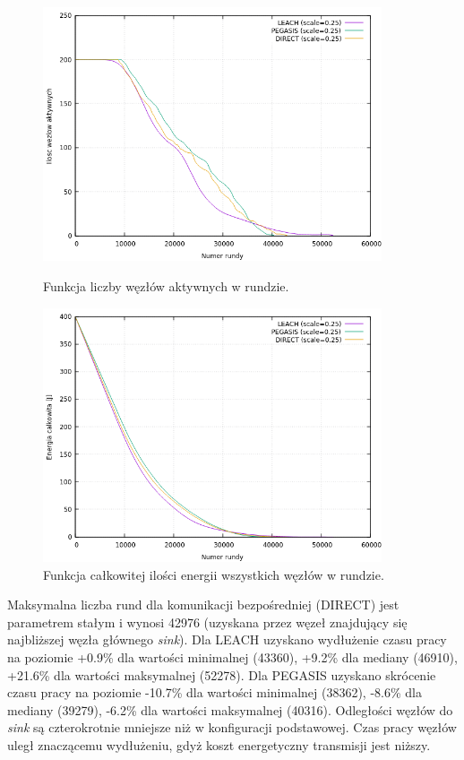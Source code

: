 \documentclass[a4paper,12pt,twoside,openany]{report}
\begin{document}
\begin{figure}[H]
 \centering
 \includegraphics[width=10cm]{images/gnuplot/test_3/nodes_in_round_xy050.png}
 \caption{Funkcja liczby węzłów aktywnych w rundzie.}
 \includegraphics[width=10cm]{images/gnuplot/test_3/energy_in_round_xy050.png}
 \caption{Funkcja całkowitej ilości energii wszystkich węzłów w rundzie.}
\end{figure}

\par
Maksymalna liczba rund dla komunikacji bezpośredniej (DIRECT) jest parametrem stałym i wynosi 42976 (uzyskana przez węzeł znajdujący się najbliższej węzła głównego \textit{sink}).
Dla LEACH uzyskano wydłużenie czasu pracy na poziomie +0.9\% dla wartości minimalnej (43360), +9.2\% dla mediany (46910), +21.6\% dla wartości maksymalnej (52278).
Dla PEGASIS uzyskano skrócenie czasu pracy na poziomie -10.7\% dla wartości minimalnej (38362), -8.6\% dla mediany (39279), -6.2\% dla wartości maksymalnej (40316).
Odległości węzłów do \textit{sink} są czterokrotnie mniejsze niż w konfiguracji podstawowej. Czas pracy węzłów uległ znaczącemu wydłużeniu, gdyż koszt energetyczny transmisji jest niższy.
\end{document}
